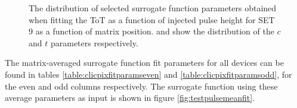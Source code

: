 \begin{figure}[h!]
\centering
{}
\label{fig:fitparams2d}
\caption[The distribution of selected surrogate function parameters obtained when fitting the ToT as a function of injected pulse height for SET 9 as a function of matrix position.  \protect{} and \protect{} show the distribution of the $c$ and $t$ parameters respectively.]{The distribution of selected surrogate function parameters obtained when fitting the ToT as a function of injected pulse height for SET 9 as a function of matrix position.  \protect{} and \protect{} show the distribution of the $c$ and $t$ parameters respectively.}
\end{figure}

The matrix-averaged surrogate function fit parameters for all devices can be found in tables \ref{table:clicpixfitparamseven} and  \ref{table:clicpixfitparamsodd}, for the even and odd columns respectively.  The surrogate function using these average parameters as input is shown in figure \ref{fig:testpulsemeanfit}.

